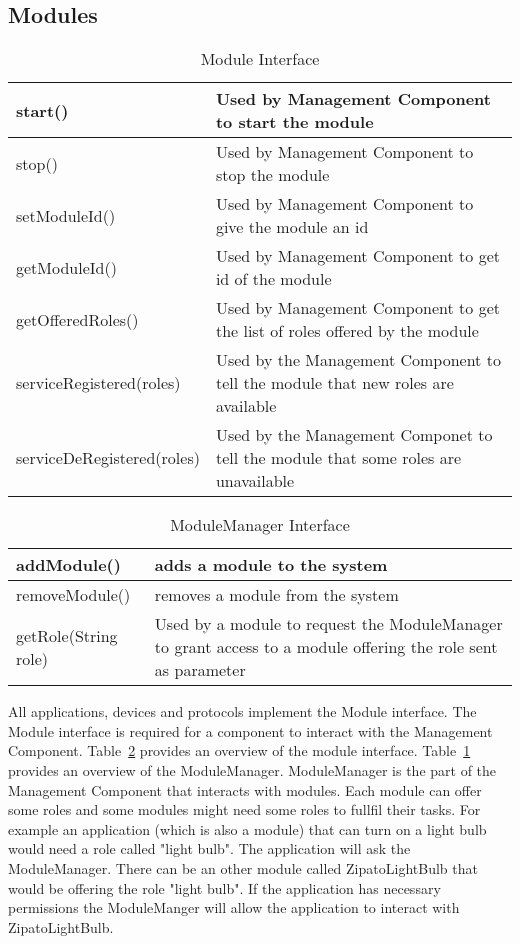 \subsection{Modules}
\label{sec:modules}
\begin{table}
\begin{center}
\begin{tabular}{| p{4cm} | p{3cm} |}
\hline
start() & Used by Management Component to start the module \\ \hline
stop() & Used by Management Component to stop the module \\ \hline
setModuleId() & Used by Management Component to give the module an id \\ \hline
getModuleId() & Used by Management Component to get id of the module \\ \hline
getOfferedRoles() & Used by Management Component to get the list of roles
offered by the module \\ \hline
serviceRegistered(roles) & Used by the Management Component to tell
the module that new roles are available \\ \hline
serviceDeRegistered(roles) & Used by the Management Componet to tell
the module that some roles are unavailable \\ \hline
\end{tabular}
\end{center}
\caption{Module Interface}
\label{tab:modulemanager}
\end{table}
\begin{table}
\begin{center}
\begin{tabular}{| p{4cm} | p{3cm} |}
\hline
addModule() & adds a module to the system \\ \hline
removeModule() & removes a module from the system \\ \hline
getRole(String role) & Used by a module to request the ModuleManager to grant
access to a module offering the role sent as parameter  \\ \hline
\end{tabular}
\end{center}
\caption{ModuleManager Interface}
\label{tab:module}
\end{table}
All applications, devices and protocols implement the Module interface. The
Module interface is required for a component to interact with the Management 
Component. Table~\ref{tab:module} provides an overview of the module interface.
Table~\ref{tab:modulemanager} provides an overview of the ModuleManager.
ModuleManager is the part of the Management Component that interacts with
modules. Each module can offer some roles and some modules might need some
roles to fullfil their tasks. For example an application (which is also a
module) that can turn on a light bulb would need a role called "light bulb".
The application will ask the ModuleManager. There can be an other module called
ZipatoLightBulb that would be offering the role "light bulb". If the
application has necessary permissions the ModuleManger will allow the
application to interact with ZipatoLightBulb.
